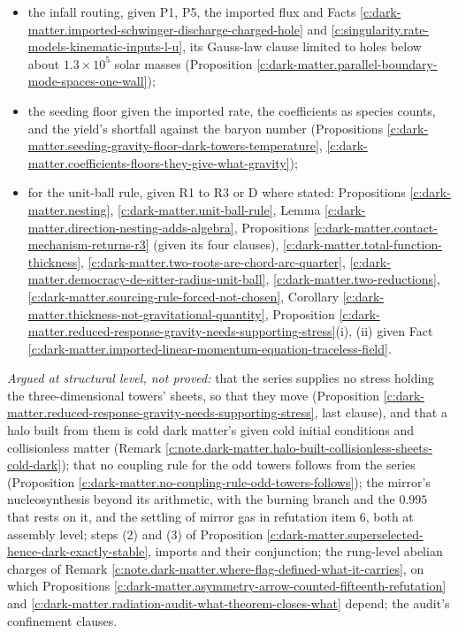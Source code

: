\documentclass[11pt]{article}
\theoremstyle{definition}
\theoremstyle{plain}
\begin{document}
\begin{itemize}
\item the infall routing, given P1, P5, the imported flux and Facts \ref{c:dark-matter.imported-schwinger-discharge-charged-hole} and \ref{c:singularity.rate-models-kinematic-inputs-l-u}, its Gauss-law clause limited to holes below about $1.3 \times 10^{5}$ solar masses (Proposition \ref{c:dark-matter.parallel-boundary-mode-spaces-one-wall});
\item the seeding floor given the imported rate, the coefficients as species counts, and the yield's shortfall against the baryon number (Propositions \ref{c:dark-matter.seeding-gravity-floor-dark-towers-temperature}, \ref{c:dark-matter.coefficients-floors-they-give-what-gravity});
\item for the unit-ball rule, given R1 to R3 or D where stated: Propositions \ref{c:dark-matter.nesting}, \ref{c:dark-matter.unit-ball-rule}, Lemma \ref{c:dark-matter.direction-nesting-adds-algebra}, Propositions \ref{c:dark-matter.contact-mechanism-returns-r3} (given its four clauses), \ref{c:dark-matter.total-function-thickness}, \ref{c:dark-matter.two-roots-are-chord-arc-quarter}, \ref{c:dark-matter.democracy-de-sitter-radius-unit-ball}, \ref{c:dark-matter.two-reductions}, \ref{c:dark-matter.sourcing-rule-forced-not-chosen}, Corollary \ref{c:dark-matter.thickness-not-gravitational-quantity}, Proposition \ref{c:dark-matter.reduced-response-gravity-needs-supporting-stress}(i), (ii) given Fact \ref{c:dark-matter.imported-linear-momentum-equation-traceless-field}.
\end{itemize}

\emph{Argued at structural level, not proved:} that the series supplies no stress holding the three-dimensional towers' sheets, so that they move (Proposition \ref{c:dark-matter.reduced-response-gravity-needs-supporting-stress}, last clause), and that a halo built from them is cold dark matter's given cold initial conditions and collisionless matter (Remark \ref{c:note.dark-matter.halo-built-collisionless-sheets-cold-dark}); that no coupling rule for the odd towers follows from the series (Proposition \ref{c:dark-matter.no-coupling-rule-odd-towers-follows}); the mirror's nucleosynthesis beyond its arithmetic, with the burning branch and the $0.995$ that rests on it, and the settling of mirror gas in refutation item 6, both at assembly level; steps (2) and (3) of Proposition \ref{c:dark-matter.superselected-hence-dark-exactly-stable}, imports and their conjunction; the rung-level abelian charges of Remark \ref{c:note.dark-matter.where-flag-defined-what-it-carries}, on which Propositions \ref{c:dark-matter.asymmetry-arrow-counted-fifteenth-refutation} and \ref{c:dark-matter.radiation-audit-what-theorem-closes-what} depend; the audit's confinement clauses.
\end{document}

